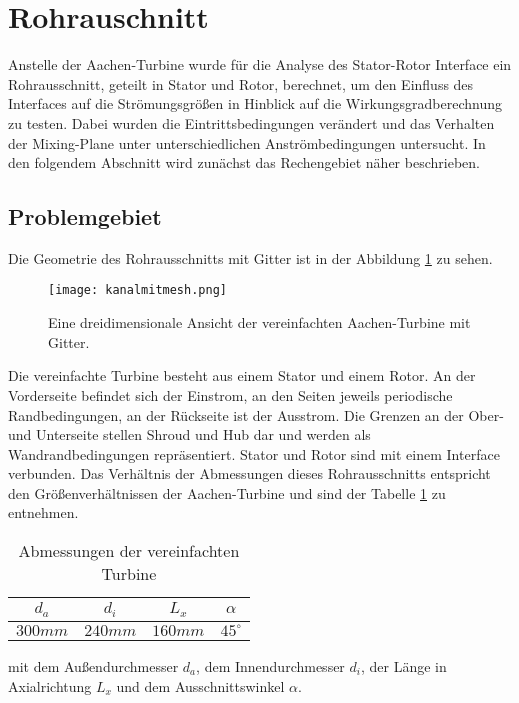 \section{Rohrauschnitt}
\label{sec:kanalgeo}
Anstelle der Aachen-Turbine wurde für die Analyse des Stator-Rotor Interface ein Rohrausschnitt, geteilt in Stator und Rotor, berechnet, um den Einfluss des Interfaces auf die Strömungsgrößen in Hinblick auf die Wirkungsgradberechnung zu testen. Dabei wurden die Eintrittsbedingungen verändert und das Verhalten der Mixing-Plane unter unterschiedlichen Anströmbedingungen untersucht. In den folgendem Abschnitt wird zunächst das Rechengebiet näher beschrieben.
\subsection{Problemgebiet}
\label{subsec:kanalproblemgebiet}
Die Geometrie des Rohrausschnitts mit Gitter ist in der Abbildung \ref{fig:kanalgebiet} zu sehen.
\begin{figure}[H]
\texttt{[image: kanalmitmesh.png]}
\caption{Eine dreidimensionale Ansicht der vereinfachten Aachen-Turbine mit Gitter.}
\label{fig:kanalgebiet}
\end{figure}
Die vereinfachte Turbine besteht aus einem Stator und einem Rotor. An der Vorderseite befindet sich der Einstrom, an den Seiten jeweils periodische Randbedingungen, an der Rückseite ist der Ausstrom. Die Grenzen an der Ober- und Unterseite stellen Shroud und Hub dar und werden als Wandrandbedingungen repräsentiert. Stator und Rotor sind mit einem Interface verbunden. Das Verhältnis der Abmessungen dieses Rohrausschnitts entspricht den Größenverhältnissen der Aachen-Turbine und sind der Tabelle \ref{tab:kanalabmessungen} zu entnehmen.
\begin{table}[H]
\centering
\label{tab:kanalabmessungen}
\caption{Abmessungen der vereinfachten Turbine}
\begin{tabular}{ c| c| c| c}
 $d_a$&$d_i$&$L_x$&$\alpha$\\
\hline
$300mm$&$240mm$&$160mm$&$45^\circ$\\
\end{tabular}
\end{table}
mit dem Außendurchmesser $d_a$, dem Innendurchmesser $d_i$, der Länge in Axialrichtung $L_x$ und dem Ausschnittswinkel $\alpha$.
